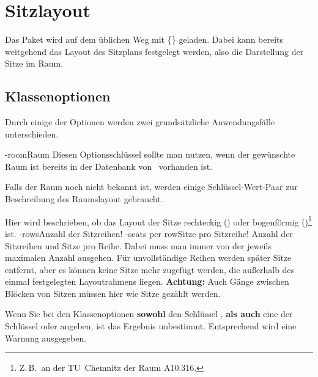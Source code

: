 \documentclass{cnltx-doc}
\def\packagename{tucseating}
\def\thepkg{\pkg*{\packagename}}
\begin{document}
\section{Sitzlayout}
Das Paket wird auf dem üblichen Weg mit
%
\{\thepkg\}
geladen.
Dabei kann bereits weitgehend das Layout des Sitzplans festgelegt werden, also
die Darstellung der Sitze im Raum.
\subsection{Klassenoptionen}
\label{sec:class-options}
Durch einige der Optionen werden zwei grundsätzliche Anwendungsfälle
unterschieden.
\begin{options}
  \keyval-{room}{Raum} Diesen Optionsschlüssel sollte man nutzen, wenn der gewünschte
  Raum ist bereits in der Datenbank von \thepkg\ vorhanden ist. 
\end{options}
Falls der Raum noch nicht bekannt ist, werden einige Schlüssel-Wert-Paar zur
Beschreibung des Raumslayout gebraucht.
\begin{options}
  Hier wird beschrieben, ob das Layout der Sitze rechteckig
  () oder bogenförmig ()\footnote{Z.\,B.\ an der
    TU~Chemnitz der Raum A10.316.} ist.
  \keyval-{rows}{Anzahl der Sitzreihen}\Default*!{}
  \keyval-{seats per row}{Sitze pro Sitzreihe}\Default!{}
  Anzahl der Sitzreihen und Sitze pro Reihe. Dabei muss man immer von der
  jeweils maximalen Anzahl ausgehen. Für unvollständige Reihen werden später Sitze
  entfernt, aber es können keine Sitze mehr zugefügt werden, die außerhalb des einmal
  festgelegten Layoutrahmens liegen. \textbf{Achtung:} Auch Gänge zwischen
  Blöcken von Sitzen müssen hier wie Sitze gezählt werden.
\end{options}
Wenn Sie bei den Klassenoptionen \textbf{sowohl} den Schlüssel , \textbf{als auch}
eine der Schlüssel  oder  angeben, ist das Ergebnis
unbestimmt. Entsprechend wird eine Warnung ausgegeben.\medskip
\end{document}
